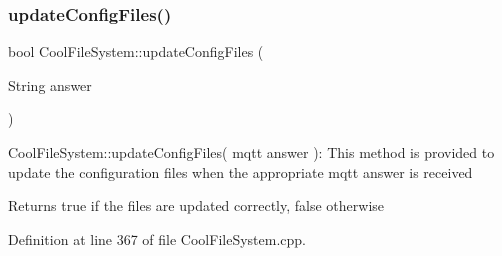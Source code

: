 \subsubsection{\texorpdfstring{update\+Config\+Files()}{updateConfigFiles()}}
{\footnotesize\ttfamily bool Cool\+File\+System\+::update\+Config\+Files (\begin{DoxyParamCaption}\item[{String}]{answer }\end{DoxyParamCaption})}

Cool\+File\+System\+::update\+Config\+Files( mqtt answer )\+: This method is provided to update the configuration files when the appropriate mqtt answer is received

\begin{DoxyReturn}{Returns}
true if the files are updated correctly, false otherwise 
\end{DoxyReturn}


Definition at line 367 of file Cool\+File\+System.\+cpp.



